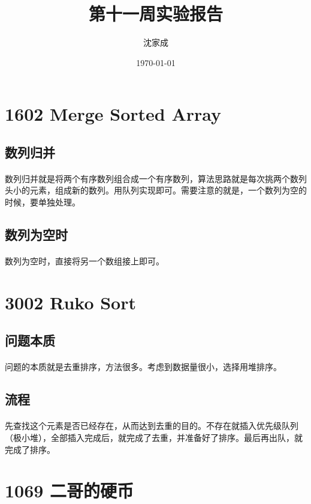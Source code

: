 \documentclass[UTF-8, 12pt]{ctexart}
\title{第十一周实验报告}
\author{沈家成}
\date{\today}
\begin{document}
\maketitle
\section{1602 Merge Sorted Array}
    \subsection{数列归并}
    \paragraph{}
    数列归并就是将两个有序数列组合成一个有序数列，算法思路就是每次挑两个数列头小的元素，组成新的数列。用队列实现即可。需要注意的就是，一个数列为空的时候，要单独处理。

    \subsection{数列为空时}
    \paragraph{}
    数列为空时，直接将另一个数组接上即可。
	    
\section{3002 Ruko Sort}
	\subsection{问题本质}
    \paragraph{}
    问题的本质就是去重排序，方法很多。考虑到数据量很小，选择用堆排序。
	\subsection{流程}
    \paragraph{}
    先查找这个元素是否已经存在，从而达到去重的目的。不存在就插入优先级队列（极小堆），全部插入完成后，就完成了去重，并准备好了排序。最后再出队，就完成了排序。

\section{1069 二哥的硬币}
\end{document}
